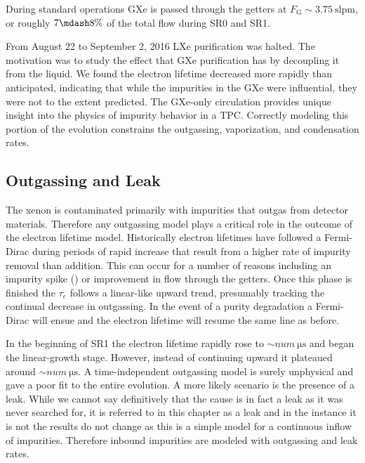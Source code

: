 During standard operations GXe is passed through the getters at $F_{\mathrm{G}} {\sim} 3.75\ \mathrm{slpm}$, or roughly $7 \mdash 8\%$ of
the total flow during SR0 and SR1.

From August 22 to September 2, 2016 LXe purification was halted.  The motivation was to study the effect that GXe purification has by
decoupling it from the liquid.  We found the electron lifetime decreased more rapidly than anticipated, indicating that while the
impurities in the GXe were influential, they were not to the extent predicted.  The GXe-only circulation provides unique insight into
the physics of impurity behavior in a TPC.  Correctly modeling this portion of the evolution constrains the outgassing, vaporization,
and condensation rates.



\subsection{Outgassing and Leak}
\label{subsec:electron_lifetime_model_outgassing}
The xenon is contaminated primarily with impurities that outgas from detector materials.  Therefore any outgassing model plays a
critical role in the outcome of the electron lifetime model.  Historically electron lifetimes have followed a Fermi-Dirac during periods
of rapid increase that result from a higher rate of impurity
removal than addition.  This can occur for a number of reasons including an impurity spike
() or improvement in flow through the getters.  Once this phase is
finished the $\tau_e$ follows a linear-like upward trend, presumably tracking the continual decrease in outgassing.  In the event of a
purity degradation a Fermi-Dirac will ensue and the electron lifetime will resume the same line as before.

In the beginning of SR1 the electron lifetime rapidly rose to ${\sim} num\ \mathrm{\mu s}$ and began the linear-growth stage.  However,
instead
of continuing upward it plateaued around ${\sim} num\ \mathrm{\mu s}$.  A time-independent outgassing model is surely unphysical and
gave a poor fit to the entire evolution.  A more likely scenario is the presence of a leak.  While we cannot say definitively that the
cause is in fact a leak as it was never searched for, it is referred to in this chapter as a leak and in the instance it is not the
results do not change as this is a simple model for a continuous inflow of impurities.  Therefore inbound impurities are modeled with
outgassing and leak rates.




